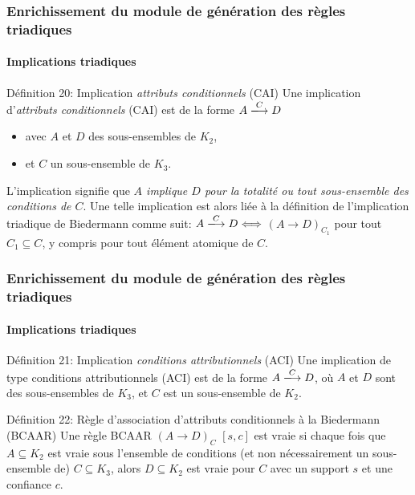 \documentclass[french]{beamer}
\begin{document}
\begin{frame}
\frametitle{Enrichissement du module de génération des règles triadiques}
\framesubtitle{Implications triadiques \parencite{Ganter2004}}
\begin{block}{Définition 20: Implication \emph{attributs conditionnels} (CAI)}
Une implication d'\emph{attributs conditionnels} (CAI) est de la forme 
$A \xlongrightarrow{C} D$
\begin{itemize}
\item avec $A$ et $D$ des sous-ensembles de $K_2$,
\item et $C$ un sous-ensemble de $K_3$. 
\end{itemize}
L'implication signifie que \emph{$A$ implique $D$ pour la totalité ou tout sous-ensemble des conditions de $C$}. Une telle implication est alors liée à la définition de l'implication triadique de Biedermann comme suit: $A \xlongrightarrow{C} D \Longleftrightarrow$  $(A \rightarrow D)_{C_1}$ pour tout $C_1 \subseteq C$, y compris pour tout élément atomique de $C$. 
\end{block}
\end{frame}
\begin{frame}
\frametitle{Enrichissement du module de génération des règles triadiques}
\framesubtitle{Implications triadiques \parencite{Ganter2004}}
\begin{block}{Définition 21: Implication \emph{conditions attributionnels} (ACI)}
Une implication de type conditions attributionnels (ACI) est de la forme $A \xlongrightarrow{C} D$, où $A$ et $D$ sont des sous-ensembles de $K_3$, et $C$ est un sous-ensemble de $K_2$.
\end{block}
\begin{block}{Définition 22: Règle d'association d'attributs conditionnels à la Biedermann (BCAAR)}
Une règle BCAAR $(A \rightarrow D)_C$ $[s, c]$ est vraie si chaque fois que $A \subseteq K_2$ est vraie sous l'ensemble de conditions (et non nécessairement un sous-ensemble de) $C \subseteq K_3$, alors $D \subseteq K_2$ est vraie pour $C$ avec un support $s$ et une confiance $c$.
\end{block}
\end{frame}
\end{document}
